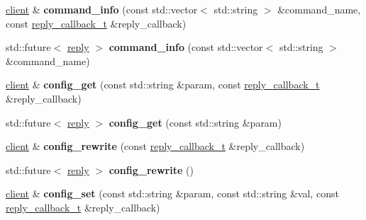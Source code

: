 \begin{DoxyCompactItemize}
\mbox{\label{classcpp__redis_1_1client_a95105c556aa5c070819bc82729d336c5}} 
\hyperlink{classcpp__redis_1_1client}{client} \& {\bfseries command\+\_\+info} (const std\+::vector$<$ std\+::string $>$ \&command\+\_\+name, const \hyperlink{classcpp__redis_1_1client_a061a1140d36d2eaeda82b09a0bb3f9f2}{reply\+\_\+callback\+\_\+t} \&reply\+\_\+callback)
\item 
\mbox{\label{classcpp__redis_1_1client_abd02a4d296ed0c160e935cd176862334}} 
std\+::future$<$ \hyperlink{classcpp__redis_1_1reply}{reply} $>$ {\bfseries command\+\_\+info} (const std\+::vector$<$ std\+::string $>$ \&command\+\_\+name)
\item 
\mbox{\label{classcpp__redis_1_1client_a510ede75cc6361f33a4cdd0695f7543f}} 
\hyperlink{classcpp__redis_1_1client}{client} \& {\bfseries config\+\_\+get} (const std\+::string \&param, const \hyperlink{classcpp__redis_1_1client_a061a1140d36d2eaeda82b09a0bb3f9f2}{reply\+\_\+callback\+\_\+t} \&reply\+\_\+callback)
\item 
\mbox{\label{classcpp__redis_1_1client_a221b1e414a4b1bb4eb2a7afaac0eb39d}} 
std\+::future$<$ \hyperlink{classcpp__redis_1_1reply}{reply} $>$ {\bfseries config\+\_\+get} (const std\+::string \&param)
\item 
\mbox{\label{classcpp__redis_1_1client_a8dcf862a8a0cb75f8cc986445eae81cf}} 
\hyperlink{classcpp__redis_1_1client}{client} \& {\bfseries config\+\_\+rewrite} (const \hyperlink{classcpp__redis_1_1client_a061a1140d36d2eaeda82b09a0bb3f9f2}{reply\+\_\+callback\+\_\+t} \&reply\+\_\+callback)
\item 
\mbox{\label{classcpp__redis_1_1client_a1a001663bd555abb70521924ec2a27f8}} 
std\+::future$<$ \hyperlink{classcpp__redis_1_1reply}{reply} $>$ {\bfseries config\+\_\+rewrite} ()
\item 
\mbox{\label{classcpp__redis_1_1client_a0cff7147cd982a39cc84f91243a27364}} 
\hyperlink{classcpp__redis_1_1client}{client} \& {\bfseries config\+\_\+set} (const std\+::string \&param, const std\+::string \&val, const \hyperlink{classcpp__redis_1_1client_a061a1140d36d2eaeda82b09a0bb3f9f2}{reply\+\_\+callback\+\_\+t} \&reply\+\_\+callback)

\end{DoxyCompactItemize}
